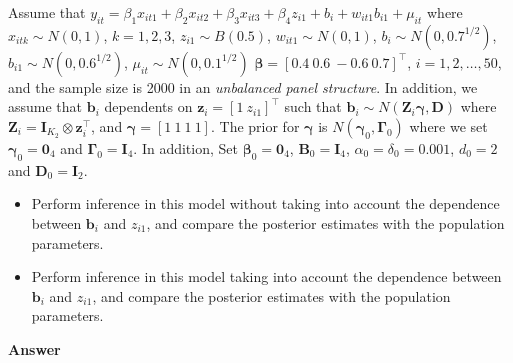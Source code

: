 \begin{enumerate}[leftmargin=*]
Assume that $y_{it}=\beta_1x_{it1}+\beta_2x_{it2}+\beta_3x_{it3}+\beta_4 z_{i1}+b_i+w_{it1}b_{i1}+\mu_{it}$ where $x_{itk}\sim N(0,1)$, $k=1,2,3$, $z_{i1}\sim B(0.5)$, $w_{it1}\sim N(0,1)$, $b_i\sim N(0, 0.7^{1/2})$, $b_{i1}\sim N(0, 0.6^{1/2})$, $\mu_{it}\sim N(0, 0.1^{1/2})$ $\bm{\beta}=[0.4 \ 0.6 \ -0.6 \ 0.7]^{\top}$, $i=1,2,\dots,50$, and the sample size is 2000 in an \textit{unbalanced panel structure}. In addition, we assume that $\bm{b}_i$ dependents on $\bm{z}_i=[1 \ z_{i1}]^{\top}$ such that $\bm{b}_i\sim N(\bm{Z}_i\bm{\gamma},\bm{D})$ where $\bm{Z}_i=\bm{I}_{K_2}\otimes \bm{z}_i^{\top}$, and $\bm{\gamma}=[1 \ 1 \ 1 \ 1]$. The prior for $\bm{\gamma}$ is $N(\bm{\gamma}_0,\bm{\Gamma}_0)$ where we set $\bm{\gamma}_0=\bm{0}_4$ and $\bm{\Gamma}_0=\bm{I}_4$. In addition, Set $\bm{\beta}_0=\bm{0}_4$, $\bm{B}_0=\bm{I}_4$, $\alpha_0=\delta_0=0.001$, $d_0=2$ and $\bm{D}_0=\bm{I}_2$. 
	\begin{itemize}
	\item Perform inference in this model without taking into account the dependence between $\bm{b}_i$ and $z_{i1}$, and compare the posterior estimates with the population parameters.
	\item Perform inference in this model taking into account the dependence between $\bm{b}_i$ and $z_{i1}$, and compare the posterior estimates with the population parameters. 
\end{itemize}

\textbf{Answer}


\end{enumerate}
